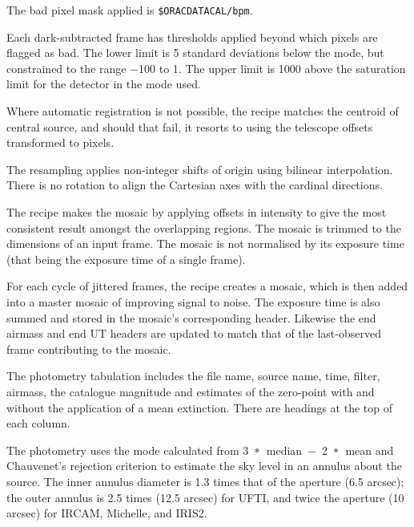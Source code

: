 \documentclass[twoside,11pt]{article}
\renewcommand{\_}{\texttt{\symbol{95}}}
\newcommand{\lsk}{\raisebox{-0.4ex}{\rm *}}
\newcommand{\sstitem}{\item}
\begin{document}
{{{         \sstitem
         The bad pixel mask applied is {\tt\$ORAC\_DATA\_CAL/bpm}.

         \sstitem
         Each dark-subtracted frame has thresholds applied beyond which
         pixels are flagged as bad.  The lower limit is 5 standard
         deviations below the mode, but constrained to the range $-$100 to 1.
         The upper limit is 1000 above the saturation limit for the detector
         in the mode used.

         \sstitem
         Where automatic registration is not possible, the recipe matches
         the centroid of central source, and should that fail, it resorts
         to using the telescope offsets transformed to pixels.

         \sstitem
         The resampling applies non-integer shifts of origin using
         bilinear interpolation.  There is no rotation to align the
         Cartesian axes with the cardinal directions.

         \sstitem
         The recipe makes the mosaic by applying offsets in intensity to
         give the most consistent result amongst the overlapping regions.
         The mosaic is trimmed to the dimensions of an input frame.  The
         mosaic is not normalised by its exposure time (that being the
         exposure time of a single frame).

         \sstitem
         For each cycle of jittered frames, the recipe creates a mosaic,
         which is then added into a master mosaic of improving signal to
         noise.  The exposure time is also summed and stored in the mosaic's
         corresponding header.  Likewise the end airmass and end UT headers
         are updated to match that of the last-observed frame contributing
         to the mosaic.

         \sstitem
         The photometry tabulation includes the file name, source name,
         time, filter, airmass, the catalogue magnitude and estimates of
         the zero-point with and without the application of a mean
         extinction.  There are headings at the top of each column.

         \sstitem

         The photometry uses the mode calculated from
         \mbox{3 $\lsk$ median $-$ 2 $\lsk$ mean} and Chauvenet's
         rejection criterion to estimate the sky level in an annulus
         about the source. The inner annulus diameter is 1.3 times
         that of the aperture (6.5 arcsec); the outer annulus is 2.5
         times (12.5 arcsec) for UFTI, and twice the aperture (10 arcsec)
         for IRCAM, Michelle, and IRIS2.
         
}}}
\end{document}

